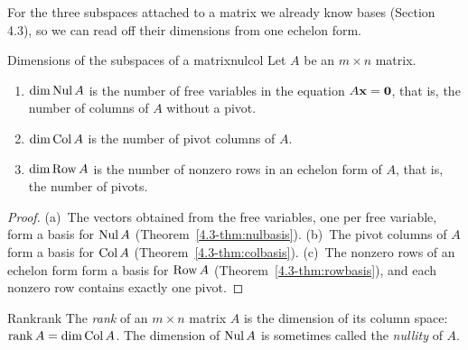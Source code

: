 \documentclass[11pt]{article}
\begin{document}
For the three subspaces attached to a matrix we already know bases (Section 4.3), so we can read off their dimensions from one echelon form.

\begin{thm}{Dimensions of the subspaces of a matrix}{nulcol}
Let $A$ be an $m\times n$ matrix.
\begin{enumerate}[label=(\alph*),itemsep=1pt]
  \item $\dim\operatorname{Nul} A$ is the number of free variables in the equation $A\mathbf{x}=\mathbf{0}$, that is, the number of columns of $A$ without a pivot.
  \item $\dim\operatorname{Col} A$ is the number of pivot columns of $A$.
  \item $\dim\operatorname{Row} A$ is the number of nonzero rows in an echelon form of $A$, that is, the number of pivots.
\end{enumerate}
\end{thm}

\begin{proof}
(a)~The vectors obtained from the free variables, one per free variable, form a basis for $\operatorname{Nul} A$ (Theorem~\ref{4.3-thm:nulbasis}). (b)~The pivot columns of $A$ form a basis for $\operatorname{Col} A$ (Theorem~\ref{4.3-thm:colbasis}). (c)~The nonzero rows of an echelon form form a basis for $\operatorname{Row} A$ (Theorem~\ref{4.3-thm:rowbasis}), and each nonzero row contains exactly one pivot.
\end{proof}

\begin{defn}{Rank}{rank}
The \emph{rank} of an $m\times n$ matrix $A$ is the dimension of its column space: $\operatorname{rank} A=\dim\operatorname{Col} A$. The dimension of $\operatorname{Nul} A$ is sometimes called the \emph{nullity} of $A$.
\end{defn}
\end{document}
